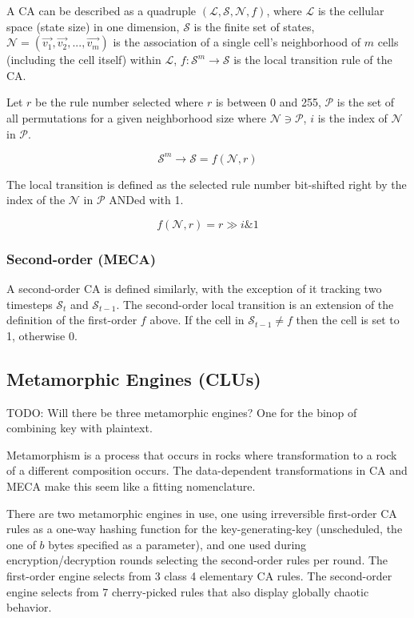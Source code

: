 \documentclass{article}
\begin{document}
A CA can be described as a quadruple $(\mathcal{L},\mathcal{S},\mathcal{N},f)$, where $\mathcal{L}$ is the cellular space (state size) in one dimension, $\mathcal{S}$ is the finite set of states, $\mathcal{N} = (\vec{v_1}, \vec{v_2}, ..., \vec{v_m})$ is the association of a single cell's neighborhood of $m$ cells (including the cell itself) within $\mathcal{L}$, $f: \mathcal{S}^{m}\rightarrow\mathcal{S}$ is the local transition rule of the CA.

Let $r$ be the rule number selected where $r$ is between 0 and 255, $\mathcal{P}$ is the set of all permutations for a given neighborhood size where $\mathcal{N} \ni \mathcal{P}$, $i$ is the index of $\mathcal{N}$ in $\mathcal{P}$.

$$
  \mathcal{S}^{m}\rightarrow\mathcal{S} = f(\mathcal{N}, r)
$$

The local transition is defined as the selected rule number bit-shifted right by the index of the $\mathcal{N}$ in $\mathcal{P}$ ANDed with 1.

$$
  f(\mathcal{N}, r) = r \gg i \mathbin{\&} 1
$$

\subsubsection{Second-order (MECA)}

A second-order CA is defined similarly, with the exception of it tracking two timesteps $\mathcal{S}_t$ and $\mathcal{S}_{t-1}$. The second-order local transition is an extension of the definition of the first-order $f$ above. If the cell in $\mathcal{S}_{t-1} \ne f$ then the cell is set to 1, otherwise 0.

\subsection{Metamorphic Engines (CLUs)}

TODO: Will there be three metamorphic engines? One for the binop of combining key with plaintext.

Metamorphism is a process that occurs in rocks where transformation to a rock of a different composition occurs. The data-dependent transformations in CA and MECA make this seem like a fitting nomenclature.

There are two metamorphic engines in use, one using irreversible first-order CA rules as a one-way hashing function for the key-generating-key (unscheduled, the one of $b$ bytes specified as a parameter), and one used during encryption/decryption rounds selecting the second-order rules per round. The first-order engine selects from 3 class 4 elementary CA rules. The second-order engine selects from 7 cherry-picked rules that also display globally chaotic behavior\cite{MECA-Properties}.
\end{document}
